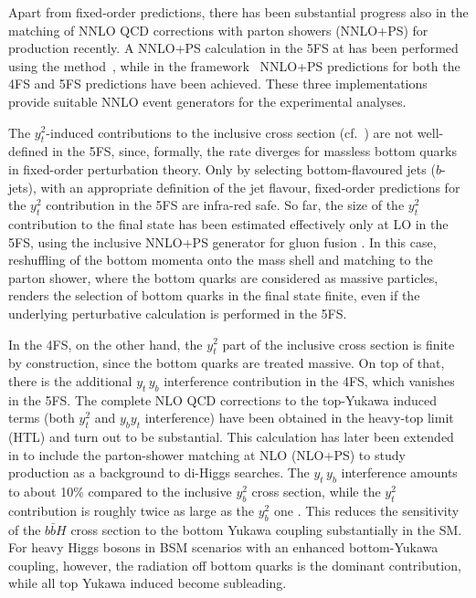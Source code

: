 \documentclass[11pt,a4paper]{article}
\begin{document}
Apart from fixed-order predictions, there has been substantial progress also in the matching of NNLO QCD corrections with parton showers (NNLO+PS) for \bbH{} production recently.
A NNLO+PS calculation in the 5FS at has been performed using the \GENEVA{} method~\cite{Gavardi:2025zpf}, while in the \minnlo{} framework~\cite{Biello:2024pgo,Biello:2024vdh} NNLO+PS predictions for both the 4FS and 5FS predictions have been achieved. 
These three implementations provide suitable NNLO event generators for the experimental analyses.

The $y_t^2$-induced contributions to the inclusive \bbH{} cross section (cf.\ ) are not well-defined in the 5FS, since, formally, the rate diverges 
for massless bottom quarks in fixed-order perturbation theory. Only by selecting bottom-flavoured jets ($b$-jets), with an appropriate
definition of the jet flavour, fixed-order predictions for the $y_t^2$ contribution in the 5FS are infra-red safe. So far, the size of the 
$y_t^2$ contribution to the \bbH{} final state has been estimated effectively only at LO in the 5FS, using the inclusive NNLO+PS 
generator for gluon fusion \cite{hamilton:2012rf,hamilton:2013fea,hamilton:2015nsa}. In this case, reshuffling of the bottom momenta onto the mass shell and matching to the parton shower, 
where the bottom quarks are considered as massive particles, renders the selection of bottom quarks in the final state finite, even if the 
underlying perturbative calculation is performed in the 5FS.

In the 4FS, on the other hand, the $y_t^2$ part of the inclusive \bbH{} cross section is finite by construction, since the bottom quarks are treated massive.
On top of that, there is the additional  $y_t\,y_b$ interference contribution in the 4FS, which vanishes in the 5FS.
The complete NLO QCD corrections to the top-Yukawa induced terms (both $y_t^2$ and $y_b y_t$ interference) 
have been obtained in the heavy-top limit (HTL) \cite{deutschmann:2018avk} and turn out to be substantial. This calculation 
has later been extended in  to include the parton-shower matching at NLO (NLO+PS) to study 
\bbH{} production as a background to di-Higgs searches. 
The $y_t\,y_b$ interference amounts to about 10\% \cite{dittmaier:2003ej,dawson:2003kb} compared to the inclusive $y_b^2$ cross section, while the $y_t^2$ contribution is roughly twice as large as the $y_b^2$ one \cite{deutschmann:2018avk}.
This reduces the sensitivity of the $b\bar bH$ cross section to the bottom Yukawa coupling substantially in the SM.
For heavy Higgs bosons in BSM scenarios with an enhanced bottom-Yukawa coupling, however, the radiation off bottom quarks is the dominant contribution,
while all top Yukawa induced become subleading.
\end{document}
